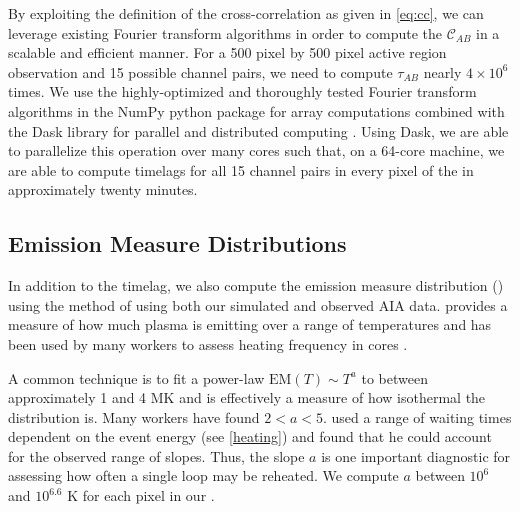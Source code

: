 By exploiting the definition of the cross-correlation as given in \autoref{eq:cc}, we can leverage existing Fourier transform algorithms in order to compute the $\mathcal{C}_{AB}$ in a scalable and efficient manner. For a 500 pixel by 500 pixel active region observation and 15 possible channel pairs, we need to compute $\tau_{AB}$ nearly $4\times10^6$ times. We use the highly-optimized and thoroughly tested Fourier transform algorithms in the NumPy python package for array computations \citep{oliphant_guide_2006} combined with the Dask library for parallel and distributed computing \citep{dask_development_team_dask_2016}. Using Dask, we are able to parallelize this operation over many cores such that, on a 64-core machine, we are able to compute timelags for all 15 channel pairs in every pixel of the \AR in approximately twenty minutes. 

\subsection{Emission Measure Distributions}\label{em_dist}

In addition to the timelag, we also compute the emission measure distribution (\dem) using the method of \citet{hannah_differential_2012} using both our simulated and observed AIA data. \dem provides a measure of how much plasma is emitting over a range of temperatures and has been used by many workers to assess heating frequency in \AR cores \citep[][and references therein]{tripathi_emission_2011,warren_constraints_2011,warren_systematic_2012,schmelz_cold_2012,bradshaw_diagnosing_2012,reep_diagnosing_2013,barnes_inference_2016,barnes_inference_2016,barnes_inference_2016-1}. 

A common technique is to fit a power-law $\mathrm{EM}(T)\sim T^a$ to \dem between approximately 1 and 4 MK and is effectively a measure of how isothermal the distribution is. Many workers \citep[see Table 3 of][and references therein]{bradshaw_diagnosing_2012} have found $2<a<5$. \citet{cargill_active_2014} used a range of waiting times dependent on the event energy (see \autoref{heating}) and found that he could account for the observed range of slopes. Thus, the \dem slope $a$ is one important diagnostic for assessing how often a single loop may be reheated. We compute $a$ between $10^6$ and $10^{6.6}$ K for each pixel in our \AR.
